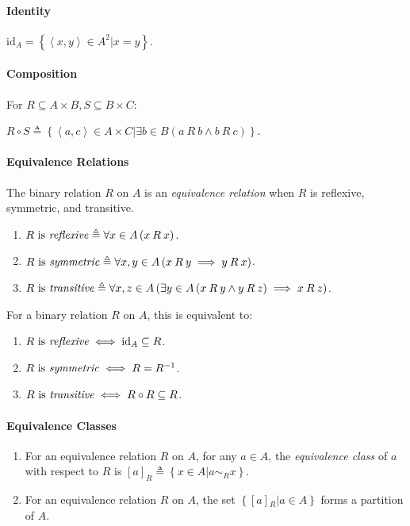 \documentclass[10pt,twoside,twocolumn]{article}
\begin{document}
\paragraph{Identity}

$\mbox{id}_{A}=\left\{ \left\langle x,y\right\rangle \in A^{2}|x=y\right\} $.


\paragraph{Composition}

For $R\subseteq A\times B,S\subseteq B\times C$:

$R\circ S\triangleq\left\{ \left\langle a,c\right\rangle \in A\times C|\exists b\in B\left(a\:R\:b\land b\:R\:c\right)\right\} $.


\paragraph{Equivalence Relations}

The binary relation $R$ on $A$ is an \emph{equivalence relation}
when $R$ is reflexive, symmetric, and transitive.
\begin{enumerate}
\item $R\mbox{ is \emph{reflexive}}\triangleq\forall x\in A\left(x\:R\:x\right)$. 
\item $R\mbox{ is \emph{symmetric}}\triangleq\forall x,y\in A\left(x\:R\:y\implies y\:R\:x\right)$. 
\item $R\mbox{ is \emph{transitive}}\triangleq\forall x,z\in A\left(\exists y\in A\left(x\:R\:y\land y\:R\:z\right)\implies x\:R\:z\right)$. 
\end{enumerate}
For a binary relation $R$ on $A$, this is equivalent to: 
\begin{enumerate}
\item $R\mbox{ is \emph{reflexive}}\iff\mbox{id}_{A}\subseteq R$. 
\item $R\mbox{ is \emph{symmetric}}\iff R=R^{-1}$. 
\item $R\mbox{ is \emph{transitive}}\iff R\circ R\subseteq R$.
\end{enumerate}

\paragraph{Equivalence Classes}
\begin{enumerate}
\item For an equivalence relation $R$ on $A$, for any $a\in A$, the \emph{equivalence
class} of $a$ with respect to $R$ is $\left[a\right]_{R}\triangleq\left\{ x\in A|a\sim_{R}x\right\} $.
\item For an equivalence relation $R$ on $A$, the set $\left\{ \left[a\right]{}_{R}|a\in A\right\} $
forms a partition of $A$.
\end{enumerate}
\end{document}

